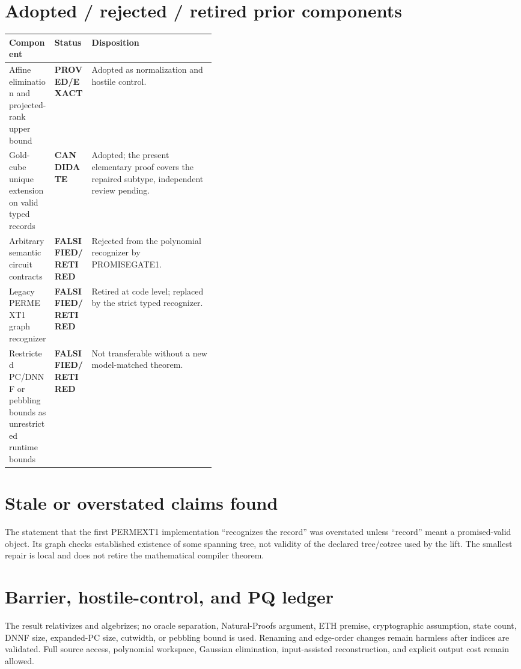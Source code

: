 \documentclass[11pt]{article}
\newcommand{\EXACT}{\textbf{PROVED/EXACT}}
\newcommand{\CAND}{\textbf{CANDIDATE}}
\newcommand{\RET}{\textbf{FALSIFIED/RETIRED}}
\begin{document}
\section{Adopted / rejected / retired prior components}
\begin{tabularx}{\linewidth}{p{0.22\linewidth}p{0.18\linewidth}X}
\toprule
Component & Status & Disposition \\
\midrule
Affine elimination and projected-rank upper bound & \EXACT & Adopted as normalization and hostile control. \\
Gold-cube unique extension on valid typed records & \CAND & Adopted; the present elementary proof covers the repaired subtype, independent review pending. \\
Arbitrary semantic circuit contracts & \RET & Rejected from the polynomial recognizer by PROMISEGATE1. \\
Legacy PERMEXT1 graph recognizer & \RET & Retired at code level; replaced by the strict typed recognizer. \\
Restricted PC/DNNF or pebbling bounds as unrestricted runtime bounds & \RET & Not transferable without a new model-matched theorem. \\
\bottomrule
\end{tabularx}

\section{Stale or overstated claims found}
The statement that the first PERMEXT1 implementation ``recognizes the record''
was overstated unless ``record'' meant a promised-valid object.  Its graph
checks established existence of some spanning tree, not validity of the
declared tree/cotree used by the lift.  The smallest repair is local and does
not retire the mathematical compiler theorem.

\section{Barrier, hostile-control, and PQ ledger}
The result relativizes and algebrizes; no oracle separation, Natural-Proofs
argument, ETH premise, cryptographic assumption, state count, DNNF size,
expanded-PC size, cutwidth, or pebbling bound is used.  Renaming and edge-order
changes remain harmless after indices are validated.  Full source access,
polynomial workspace, Gaussian elimination, input-assisted reconstruction,
and explicit output cost remain allowed.
\end{document}
